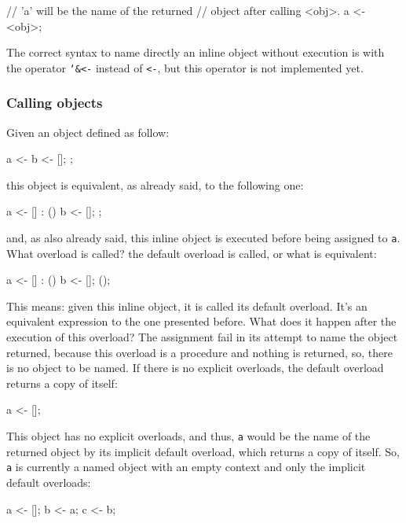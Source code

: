 \documentclass{article}
\begin{document}
\begin{faupp2}
  // 'a' will be the name of the returned
  // object after calling <obj>.
  a <- <obj>;
\end{faupp2}

The correct syntax to name directly an inline object without execution is with
the operator \texttt{\char`\&<-} instead of \texttt{<-}, but this operator is
not implemented yet.

\subsubsection{Calling objects}
Given an object defined as follow:

\begin{faupp2}
  a <- {
         b <- [];
       };
\end{faupp2}

this object is equivalent, as already said, to the following one:

\begin{faupp2}
  a <- [] : ()
       {
         b <- [];
       };
\end{faupp2}

and, as also already said, this inline object is executed before being assigned
to \texttt{a}. What overload is called? the default overload is called, or what
is equivalent:

\begin{faupp2}
  a <- [] : ()
       {
         b <- [];
       }();
\end{faupp2}

This means: given this inline object, it is called its default overload. It's an
equivalent expression to the one presented before. What does it happen after the
execution of this overload? The assignment fail in its attempt to name the
object returned, because this overload is a procedure and nothing is returned,
so, there is no object to be named. If there is no explicit overloads, the
default overload returns a copy of itself:

\begin{faupp2}
  a <- [];
\end{faupp2}

This object has no explicit overloads, and thus, \texttt{a} would be the name of
the returned object by its implicit default overload, which returns a copy of
itself. So, \texttt{a} is currently a named object with an empty context and
only the implicit default overloads:

\begin{faupp2}
  a <- [];
  b <- a;
  c <- b;
\end{faupp2}
\end{document}
